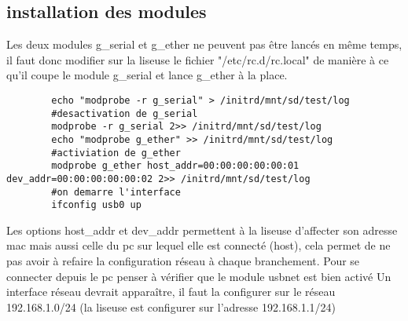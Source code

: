\subsection{installation des modules}	
	Les deux modules g_serial et g_ether ne peuvent pas être lancés en même temps, il faut donc modifier sur la liseuse le fichier "/etc/rc.d/rc.local" de manière à ce qu'il coupe le module g_serial et lance g_ether à la place.
	\begin{verbatim}
		echo "modprobe -r g_serial" > /initrd/mnt/sd/test/log
		#desactivation de g_serial
		modprobe -r g_serial 2>> /initrd/mnt/sd/test/log
		echo "modprobe g_ether" >> /initrd/mnt/sd/test/log
		#activiation de g_ether
		modprobe g_ether host_addr=00:00:00:00:00:01 dev_addr=00:00:00:00:00:02 2>> /initrd/mnt/sd/test/log
		#on demarre l'interface
		ifconfig usb0 up
	\end{verbatim}
	Les options host_addr et dev_addr permettent à la liseuse d'affecter son adresse mac mais aussi celle du pc sur lequel elle est connecté (host), cela permet de ne pas avoir à refaire la configuration réseau à chaque branchement.	
	Pour se connecter depuis le pc penser à vérifier que le module usbnet est bien activé	
	Un interface réseau devrait apparaître, il faut la configurer sur le réseau 192.168.1.0/24 (la liseuse est configurer sur l'adresse 192.168.1.1/24)
	